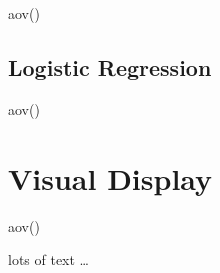 \documentclass{article}
\begin{document}
\begin{multicols}{3}
\begin{description}
\item[aov()]
\end{description}

\subsection*{Logistic Regression}

\begin{description}
\item[aov()]
\end{description}

\section*{Visual Display}

\begin{description}
\item[aov()]
\end{description}


  lots of text
  \ldots
\end{multicols}
\end{document}
